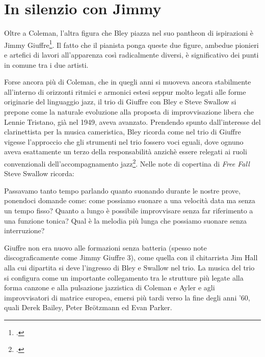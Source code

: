 \section{In silenzio con Jimmy}
Oltre a Coleman, l'altra figura che Bley piazza nel suo pantheon di ispirazioni è Jimmy Giuffre\footcite{hamilton}. Il fatto che il pianista ponga queste due figure, ambedue pionieri e artefici di lavori all'apparenza così radicalmente diversi, è significativo dei punti in comune tra i due artisti.\par
Forse ancora più di Coleman, che in quegli anni si muoveva ancora stabilmente all'interno di orizzonti ritmici e armonici estesi seppur molto legati alle forme originarie del linguaggio jazz, il trio di Giuffre con Bley e Steve Swallow si prepone come la naturale evoluzione alla proposta di improvvisazione libera che Lennie Tristano, già nel 1949, aveva avanzato. Prendendo spunto dall'interesse del clarinettista per la musica cameristica, Bley ricorda come nel trio di Giuffre vigesse l'approccio che gli strumenti nel trio fossero voci eguali, dove ognuno aveva esattamente un terzo della responsabilità anzichè essere relegati ai ruoli convenzionali dell'accompagnamento jazz\footcite[389]{johnston}. Nelle note di copertina di \textit{Free Fall} Steve Swallow ricorda:
\begin{fquote}
	Passavamo tanto tempo parlando quanto suonando durante le nostre prove, ponendoci domande come: come possiamo suonare a una velocità data ma senza un tempo fisso? Quanto a lungo è possibile improvvisare senza far riferimento a una funzione tonica? Qual è la melodia più lunga che possiamo suonare senza interruzione?
\end{fquote}
Giuffre non era nuovo alle formazioni senza batteria (spesso note discograficamente come Jimmy Giuffre 3), come quella con il chitarrista Jim Hall alla cui dipartita si deve l'ingresso di Bley e Swallow nel trio.
La musica del trio si configura come un importante collegamento tra le strutture più legate alla forma canzone e alla pulsazione jazzistica di Coleman e Ayler e agli improvvisatori di matrice europea, emersi più tardi verso la fine degli anni '60, quali Derek Bailey, Peter Brötzmann ed Evan Parker.\par
